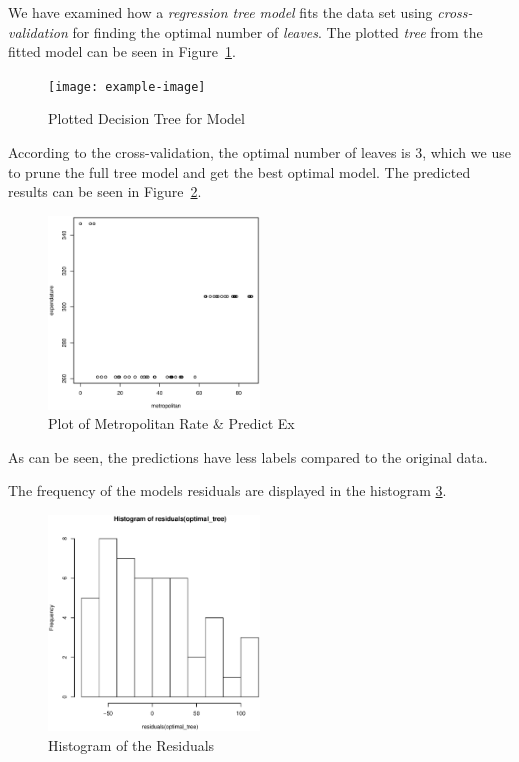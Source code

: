 \documentclass[a4paper, twocolumn]{article}
\begin{document}
    We have examined how a \emph{regression tree model} fits the data set using \emph{cross-validation} for finding the optimal number of \emph{leaves}. The plotted \emph{tree} from the fitted model can be seen in Figure~\ref{fig:tree}.

    \begin{figure}[h!]
        \centering
        \caption{Plotted Decision Tree for Model}
        \label{fig:tree}
        \texttt{[image: example-image]}
    \end{figure}

    According to the cross-validation, the optimal number of leaves is 3, which we use to prune the full tree model and get the best optimal model. The predicted results can be seen in Figure~\ref{fig:predicted}.

    \begin{figure}[h!]
        \centering
        \caption{Plot of Metropolitan Rate \& Predict Ex}
        \label{fig:predicted}
        \includegraphics[width=0.5\textwidth]{share/A1_fit.eps}
    \end{figure}

    As can be seen, the predictions have less labels compared to the original data.

    The frequency of the models residuals are displayed in the histogram \ref{fig:residuals}.

    \begin{figure}[h!]
        \centering
        \caption{Histogram of the Residuals}
        \label{fig:residuals}
        \includegraphics[width=0.5\textwidth]{share/A1_historgram_residuals.eps}
    \end{figure}
\end{document}
